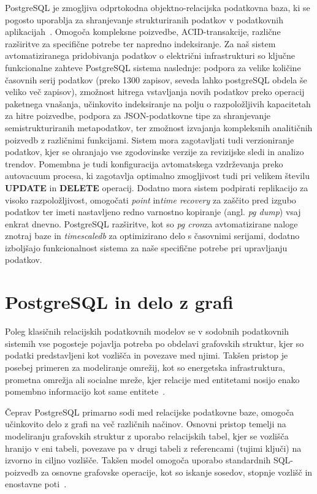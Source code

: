 \documentclass[a4paper,12pt,openright]{book}
\begin{document}
PostgreSQL je zmogljiva odprtokodna objektno-relacijska podatkovna baza, ki se pogosto uporablja za shranjevanje strukturiranih podatkov v podatkovnih aplikacijah~\cite{postgresql_docs}. Omogoča kompleksne poizvedbe, ACID-transakcije, različne razširitve za specifične potrebe ter napredno indeksiranje.
Za naš sistem avtomatiziranega pridobivanja podatkov o električni infrastrukturi so ključne funkcionalne zahteve PostgreSQL sistema naslednje: podpora za velike količine časovnih serij podatkov (preko 1300 zapisov, seveda lahko postgreSQL obdela še veliko več zapisov), zmožnost hitrega vstavljanja novih podatkov preko operacij paketnega vnašanja, učinkovito indeksiranje na polju o razpoložljivih kapacitetah za hitre poizvedbe, podpora za JSON-podatkovne tipe za shranjevanje semistrukturiranih metapodatkov, ter zmožnost izvajanja kompleksnih analitičnih poizvedb z različnimi funkcijami. Sistem mora zagotavljati tudi verzioniranje podatkov, kjer se ohranjajo vse zgodovinske verzije za revizijske sledi in analizo trendov.
Pomembna je tudi konfiguracija avtomatskega vzdrževanja preko autovacuum procesa, ki zagotavlja optimalno zmogljivost tudi pri velikem številu \textbf{UPDATE} in \textbf{DELETE} operacij.
Dodatno mora sistem podpirati replikacijo za visoko razpoložljivost, omogočati \textit{point} in\textit{time recovery} za zaščito pred izgubo podatkov ter imeti nastavljeno redno varnostno kopiranje (angl. \textit{pg dump}) vsaj enkrat dnevno. PostgreSQL razširitve, kot so \textit{pg cron}za avtomatizirane naloge znotraj baze in \textit{timescaledb} za optimizirano delo s časovnimi serijami, dodatno izboljšajo funkcionalnost sistema za naše specifične potrebe pri upravljanju podatkov.

\section{PostgreSQL in delo z grafi}

Poleg klasičnih relacijskih podatkovnih modelov se v sodobnih podatkovnih sistemih vse pogosteje pojavlja potreba po obdelavi grafovskih struktur, kjer so podatki predstavljeni kot vozlišča in povezave med njimi. Takšen pristop je posebej primeren za modeliranje omrežij, kot so energetska infrastruktura, prometna omrežja ali socialne mreže, kjer relacije med entitetami nosijo enako pomembno informacijo kot same entitete~\cite{Angles2018}.

Čeprav PostgreSQL primarno sodi med relacijske podatkovne baze, omogoča učinkovito delo z grafi na več različnih načinov. Osnovni pristop temelji na modeliranju grafovskih struktur z uporabo relacijskih tabel, kjer se vozlišča hranijo v eni tabeli, povezave pa v drugi tabeli z referencami (tujimi ključi) na izvorno in ciljno vozlišče. Takšen model omogoča uporabo standardnih SQL-poizvedb za osnovne grafovske operacije, kot so iskanje sosedov, stopnje vozlišč in enostavne poti~\cite{CELKO20043}.
\end{document}
